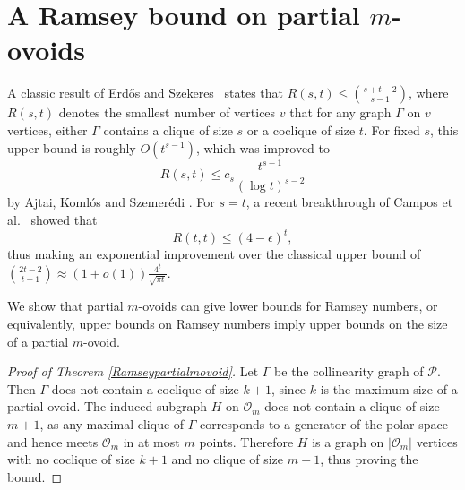 \documentclass[a4paper,11pt]{amsproc}
\theoremstyle{plain}
\theoremstyle{definition}
\newcommand{\<}{\langle}
\renewcommand{\>}{\rangle} %
\begin{document}
\section{A Ramsey bound on partial \texorpdfstring{$m$}{m}-ovoids}
\label{sec:ramsey_part}

A classic result of Erd\H{o}s and Szekeres~\cite{es1935} states that $R(s, t) \leq \binom{s+t-2}{s-1}$, 
where $R(s, t)$ denotes the smallest number of vertices $v$ that
for any graph $\Gamma$ on $v$ vertices, either $\Gamma$ contains 
a clique of size $s$ or a coclique of size $t$. 
For fixed $s$, this upper bound is roughly $O(t^{s - 1})$, which was improved to 
\[R(s, t) \leq c_s \frac{t^{s - 1}}{(\log t)^{s - 2}}\]
by  Ajtai, Koml\'os and Szemer\'edi \cite{AKS1980}. 
For $s = t$, a recent breakthrough of Campos et al.~\cite{campos2023} showed that 
\[R(t,t) \leq (4 - \epsilon)^t,\]
thus making an exponential improvement over the classical upper bound of $\binom{2t - 2}{t - 1} \approx (1 + o(1)) \frac{4^t}{\sqrt{\pi t}}$.

We show that partial $m$-ovoids can give lower bounds for Ramsey numbers, or equivalently, upper bounds on Ramsey numbers imply upper bounds on the size of a partial $m$-ovoid. 


\begin{proof}[Proof of Theorem \ref{Ramseypartialmovoid}]
Let $\Gamma$ be the collinearity graph of $\mathcal{P}$. 
Then $\Gamma$ does not contain a coclique of size $k + 1$, since $k$ is the maximum size of a partial ovoid. 
The induced subgraph $H$ on $\mathcal{O}_m$ does not contain a clique of size $m + 1$, as any maximal clique of $\Gamma$ corresponds to a generator of the polar space and hence meets $\mathcal{O}_m$ in at most $m$ points. 
Therefore $H$ is a graph on $|\mathcal{O}_m|$ vertices with no coclique of size $k + 1$ and no clique of size $m+1$, thus proving the bound. 
\end{proof}
\end{document}
